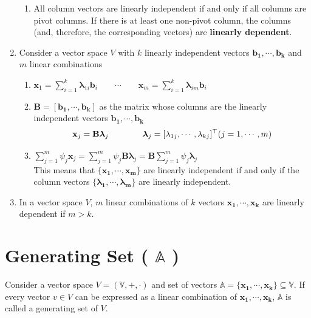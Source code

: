 \begin{enumerate}
\begin{enumerate}
        \item All column vectors are linearly independent if and only if all columns are pivot columns. If there is at least one non-pivot column, the columns (and, therefore, the corresponding vectors) are \textbf{linearly dependent}.
    \end{enumerate}

    \item Consider a vector space $V$ with $k$ linearly independent vectors $\mathbf{b_1, \cdots, b_k}$ and $m$ linear combinations
    \begin{enumerate}
        \item \( \displaystyle \mathbf{x}_1  = \sum_{i=1}^{k} \bm{\lambda}_{1i} \mathbf{b}_i  \quad\quad\cdots\quad\quad \mathbf{x}_m = \sum_{i=1}^{k} \bm{\lambda}_{im} \mathbf{b}_i \)

        \item $\mathbf{B} = [\mathbf{b_1, \cdots, b_k}]$ as the matrix whose columns are the linearly independent vectors $\mathbf{b_1, \cdots, b_k}$
        \[
            \mathbf{x}_j = \mathbf{B{\bm{\lambda}}}_j \quad\quad\quad\quad \bm{\lambda}_j = [\lambda_{1j}, \cdots, \lambda_{kj}]^\top
            \hfill (j=1, \cdots,m)
        \]

        \item \( \displaystyle \sum_{j=1}^{m} \psi_j \mathbf{x}_j = \sum_{j=1}^{m} \psi_j \mathbf{B}\bm{\lambda}_j = \mathbf{B}\sum_{j=1}^{m} \psi_j \bm{\lambda}_j \)\\
        This means that $\{\mathbf{x_1, \cdots, x_m}\}$ are linearly independent if and only if the column vectors $\{\bm{\lambda_1, \cdots, \lambda_m}\}$ are linearly independent.

    \end{enumerate}

    \item In a vector space $V$, $m$ linear combinations of $k$ vectors $\mathbf{x_1, \cdots, x_k}$ are linearly dependent if $m > k$.
\end{enumerate}







\section{Generating Set ( $\mathbb{A}$ ) \cite{mfml-1}}\label{Generating Set}
Consider a vector space $V = (\mathbb{V}, +, \cdot)$ and set of vectors $\mathbb{A} = \mathbf{\{x_1, \cdots , x_k\}} \subseteq \mathbb{V}$. If every vector $v \in V$ can be expressed as a linear combination of $\mathbf{x_1, \cdots , x_k}$, $\mathbb{A}$ is called a generating set of $V$.

